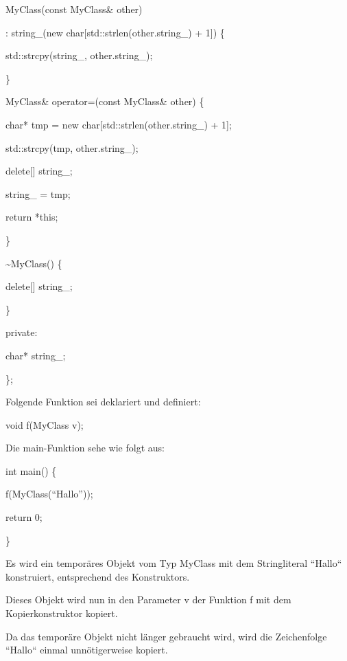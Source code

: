 \documentclass{article}
\begin{document}
\vspace{12pt}
\parindent=0pt
MyClass(const MyClass\& other)        

\parindent=28pt
: string\_(new char[std::strlen(other.string\_) + 1]) \{        

std::strcpy(string\_, other.string\_);    

\parindent=43pt
\}    

\vspace{12pt}
\parindent=0pt
MyClass\& operator=(const MyClass\& other) \{        

\parindent=28pt
char* tmp = new char[std::strlen(other.string\_) + 1];        

std::strcpy(tmp, other.string\_);        

\parindent=57pt
delete[] string\_;        

\parindent=28pt
string\_ = tmp;        

return *this;    

\parindent=43pt
\}    

\vspace{12pt}
\parindent=14pt
\textasciitilde{}MyClass() \{        

\parindent=28pt
delete[] string\_;    

\parindent=14pt
\}

\vspace{12pt}
\parindent=0pt
private:    

\parindent=14pt
char* string\_;

\parindent=0pt
\};

\vspace{12pt}
Folgende Funktion sei deklariert und definiert:

void f(MyClass v);

\vspace{12pt}
Die main-Funktion sehe wie folgt aus:

int main() \{    

\parindent=14pt
f(MyClass(``Hallo''));    

return 0;

\}

\vspace{12pt}
\parindent=0pt
Es wird ein temporäres Objekt vom Typ MyClass mit dem Stringliteral ``Hallo`` 
konstruiert, entsprechend des Konstruktors.

Dieses Objekt wird nun in den Parameter v der Funktion f mit dem Kopierkonstruktor 
kopiert.

\vspace{12pt}
Da das temporäre Objekt nicht länger gebraucht wird, wird die Zeichenfolge ``Hallo`` 
einmal unnötigerweise kopiert.
\end{document}
